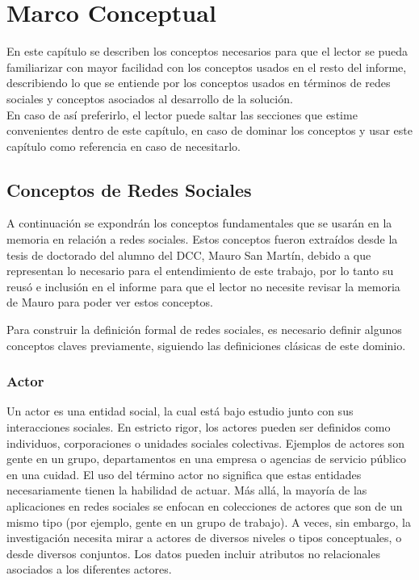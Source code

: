 \chapter{Marco Conceptual}

En este capítulo se describen los conceptos necesarios para que el lector se pueda familiarizar con mayor facilidad con los conceptos usados en el resto del informe, describiendo lo que se entiende por los conceptos usados en términos de redes sociales y conceptos asociados al desarrollo de la solución.\\

En caso de así preferirlo, el lector puede saltar las secciones que estime convenientes dentro de este capítulo, en caso de dominar los conceptos y usar este capítulo como referencia en caso de necesitarlo.

\section{Conceptos de Redes Sociales} %
\label{sec:conceptos_de_redes_sociales}


A continuación se expondrán los conceptos fundamentales que se usarán en la memoria en relación a redes sociales. Estos conceptos fueron extraídos desde la tesis de doctorado del alumno del DCC, Mauro San Martín\cite{tesismauro}, debido a que representan lo necesario para el entendimiento de este trabajo, por lo tanto su reusó e inclusión en el informe para que el lector no necesite revisar la memoria de Mauro para poder ver estos conceptos.

Para construir la definición formal de redes sociales, es necesario definir algunos conceptos claves previamente, siguiendo las definiciones clásicas de este dominio\cite{sna}.

\subsection{Actor} %
\label{sub:actor}
Un actor es una entidad social, la cual está bajo estudio junto con sus interacciones sociales. En estricto rigor, los actores pueden ser definidos como individuos, corporaciones o unidades sociales colectivas. Ejemplos de actores son gente en un grupo, departamentos en una empresa o agencias de servicio público en una cuidad. El uso del término actor no significa que estas entidades necesariamente tienen la habilidad de actuar. Más allá, la mayoría de las aplicaciones en redes sociales se enfocan en colecciones de actores que son de un mismo tipo (por ejemplo, gente en un grupo de trabajo). A veces, sin embargo, la investigación necesita mirar a actores de diversos niveles o tipos conceptuales, o desde diversos conjuntos. Los datos pueden incluir atributos no relacionales asociados a los diferentes actores.

